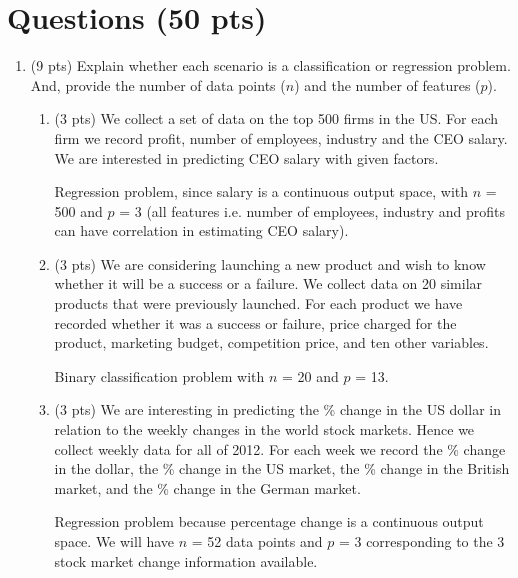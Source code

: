 \documentclass[a4paper]{article}
\theoremstyle{definition}
\newenvironment{soln}{
    \leavevmode\color{blue}\ignorespaces
}{}
\begin{document}
\section{Questions (50 pts)}
\begin{enumerate}
\item (9 pts) Explain whether each scenario is a classification or regression problem. And, provide the number of data points ($n$) and the number of features ($p$).

\begin{enumerate}
	\item (3 pts) We collect a set of data on the top 500 firms in the US. For each firm we record profit, number of employees, industry and the CEO salary. We are interested in predicting CEO salary with given factors.
	
	\begin{soln} Regression problem, since salary is a continuous output space, with $n$ = 500 and $p$ = 3 (all features i.e. number of employees, industry and profits can have correlation in estimating CEO salary). \end{soln}
	
	\item (3 pts) We are considering launching a new product and wish to know whether it will be a success or a failure. We collect data on 20 similar products that were previously launched. For each product we have recorded whether it was a success or failure, price charged for the product, marketing budget, competition price, and ten other variables.
	
	\begin{soln}  Binary classification problem with $n$ = 20 and $p$ = 13. \end{soln}
	
	\item (3 pts) We are interesting in predicting the \% change in the US dollar in relation to the weekly changes in the world stock markets. Hence we collect weekly data for all of 2012. For each week we record the \% change in the dollar, the \% change in the US market, the \% change in the British market, and the \% change in the German market.
	
	\begin{soln}  Regression problem because percentage change is a continuous output space. We will have $n$ = 52 data points and $p$ = 3 corresponding to the 3 stock market change information available. \end{soln}
	

\end{enumerate}
\end{enumerate}
\end{document}
